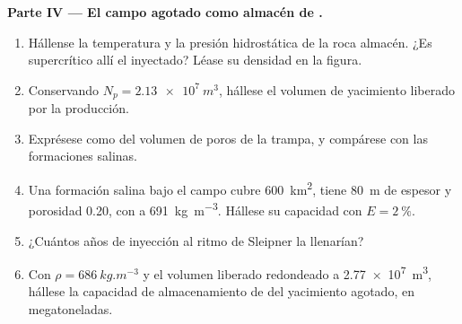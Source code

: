 \begin{problem}
\noindent\textbf{Parte IV --- El campo agotado como almacén de .}
\begin{enumerate}[resume]
  \item Hállense la temperatura y la presión hidrostática de la roca almacén. ¿Es supercrítico allí el 
        inyectado? Léase su densidad en la figura.
  \item Conservando $N_p = \qty{2.13e7}{m^3}$, hállese el volumen de yacimiento liberado por la producción.
  \item Exprésese como  del volumen de poros de la trampa, y compárese con
        las formaciones salinas.
  \item Una formación salina bajo el campo cubre \qty{600}{km^2}, tiene \qty{80}{m} de espesor y
        porosidad 0.20, con  a \qty{691}{kg.m^{-3}}. Hállese su capacidad con $E =
        \qty{2}{\percent}$.
  \item ¿Cuántos años de inyección al ritmo de Sleipner la llenarían?
  \item Con $\rho = \qty{686}{kg.m^{-3}}$ y el volumen liberado redondeado a \qty{2.77e7}{m^3}, hállese
        la capacidad de almacenamiento de  del yacimiento agotado, en megatoneladas.
\end{enumerate}
\end{problem}
